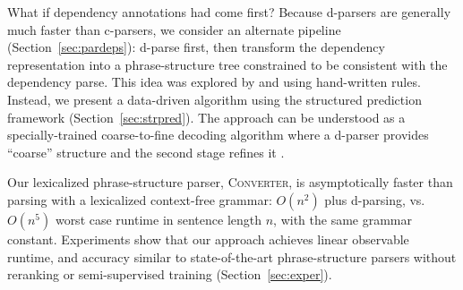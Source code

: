 \documentclass[11pt,letterpaper]{article}
\newcommand{\ParseName}{\textsc{Converter}\xspace}
\newcommand{\lpkcomment}[1]{\textcolor{red}{\bf \small [#1 --lpk]}}
\begin{document}
What if dependency annotations had come first?  Because d-parsers are
generally much faster than c-parsers, we consider an alternate
pipeline (Section~\ref{sec:pardeps}): d-parse first, then transform the dependency representation
into a phrase-structure tree constrained to be consistent with the
dependency parse.  This idea was explored by   and
 using hand-written rules.  Instead, we present a data-driven
algorithm using the structured prediction framework (Section~\ref{sec:strpred}).  The approach can be
understood as a specially-trained coarse-to-fine
decoding algorithm where a d-parser provides ``coarse'' structure and
the second stage refines it \cite{charniak2005coarse,petrov2007improved}.

Our lexicalized phrase-structure parser, \ParseName, is asymptotically faster than
parsing with a lexicalized context-free grammar: $O(n^2)$ plus
d-parsing, vs.~$O(n^5)$ worst case runtime in sentence length $n$,
with the same grammar constant.  Experiments show
that our approach achieves linear observable
runtime, and accuracy similar to
state-of-the-art phrase-structure parsers without reranking or
semi-supervised training (Section~\ref{sec:exper}).






\end{document}
